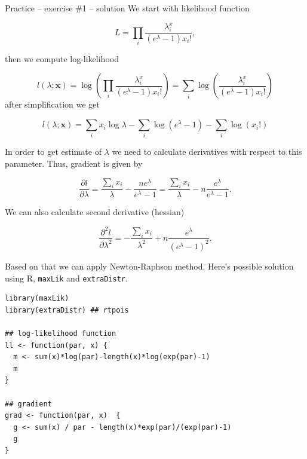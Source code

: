 \documentclass[10pt,ignorenonframetext,aspectratio=169]{beamer}
\begin{document}
\begin{frame}{Practice -- exercise \#1 -- solution}
We start with likelihood function

\begin{equation}
    L = \prod_i \frac{\lambda^x_i}{(e^\lambda-1)x_i!},
\end{equation}

then we compute log-likelihood

\begin{equation}
    l(\lambda; \mathbf{x}) = \log
    \left(
    \prod_i \frac{\lambda^x_i}{(e^\lambda-1)x_i!}
    \right) = 
    \sum_i \log 
    \left( 
    \frac{\lambda^x_i}{(e^\lambda-1)x_i!}
    \right)
\end{equation}
after simplification we get

\begin{equation}
   l(\lambda; \mathbf{x}) = \sum_i x_i \log \lambda - \sum_i \log(e^\lambda-1) - \sum_i \log(x_i!) 
\end{equation}

\newpage

In order to get estimate of $\lambda$ we need to calculate derivatives with respect to this parameter. Thus, gradient is given by 

\begin{equation}
    \frac{\partial l}{\partial \lambda} = \frac{\sum_i x_i}{\lambda} - \frac{n e^\lambda}{e^\lambda - 1} = 
    \frac{\sum_i x_i}{\lambda} - n \frac{e^\lambda}{e^\lambda - 1}.    
\end{equation}

We can also calculate second derivative (hessian)

\begin{equation}
    \frac{\partial^2 l}{\partial \lambda^2} =  - \frac{\sum_i x_i}{\lambda^2} + n \frac{e^\lambda}{(e^\lambda-1)^2}.
\end{equation}

Based on that we can apply Newton-Raphson method. Here's possible solution using R, \texttt{maxLik} and  \texttt{extraDistr}.

\begin{verbatim}
library(maxLik)
library(extraDistr) ## rtpois

## log-likelihood function
ll <- function(par, x) {
  m <- sum(x)*log(par)-length(x)*log(exp(par)-1)
  m
}

## gradient
grad <- function(par, x)  {
  g <- sum(x) / par - length(x)*exp(par)/(exp(par)-1)
  g
}



\end{verbatim}
\end{frame}
\end{document}
